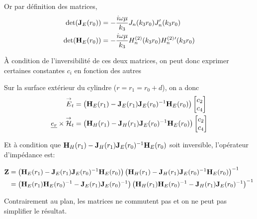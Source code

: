         Or par définition des matrices,
        \begin{align}
            \det(\mathbf{J}_E(r_0)) &= -\dfrac{i\omega\mu}{k_3}J_n(k_3r_0)J_n'(k_3r_0)
            \\
            \det(\mathbf{H}_E(r_0)) &= -\dfrac{i\omega\mu}{k_3}H_n^{(2)}(k_3r_0)H_n^{(2)}{}'(k_3r_0)
        \end{align}

        
        À condition de l'inversibilité de ces deux matrices, on peut donc exprimer certaines constantes $c_i$ en fonction des autres

        Sur la surface extérieur du cylindre ($r=r_1= r_0 + d$), on a donc 
        \begin{align}
            {\overset{\rightarrow}{E}}_t &= 
            \left(\mathbf{H}_{E}(r_1) - \mathbf{J}_{E}(r_1)\mathbf{J}_{E}(r_0)^{-1}\mathbf{H}_{E}(r_0)\right)
            \begin{bmatrix}
                c_2 \\
                c_4
            \end{bmatrix}
            \\
            \underline{e_r}\times{\overset{\rightarrow}{\mathcal{H}}}_t &= 
            \left(\mathbf{H}_{H}(r_1) - \mathbf{J}_{H}(r_1)\mathbf{J}_{E}(r_0)^{-1}\mathbf{H}_{E}(r_0) \right)
            \begin{bmatrix}
                c_2 \\
                c_4
            \end{bmatrix}
        \end{align}

        Et à condition que $\mathbf{H}_{H}(r_1) - \mathbf{J}_{H}(r_1)\mathbf{J}_{E}(r_0)^{-1}\mathbf{H}_{E}(r_0)$ soit inversible, l'opérateur d'impédance est:


        \begin{align}
            \mathbf{Z} &= 
            \left(\mathbf{H}_{E}(r_1) - \mathbf{J}_{E}(r_1)\mathbf{J}_{E}(r_0)^{-1}\mathbf{H}_{E}(r_0)\right)
            \left(\mathbf{H}_{H}(r_1) - \mathbf{J}_{H}(r_1)\mathbf{J}_{E}(r_0)^{-1}\mathbf{H}_{E}(r_0)\right)^{-1}
            \\
            &=
            \left(\mathbf{H}_{E}(r_1)\mathbf{H}_{E}(r_0)^{-1} - \mathbf{J}_{E}(r_1)\mathbf{J}_{E}(r_0)^{-1}\right)
            \left(\mathbf{H}_{H}(r_1)\mathbf{H}_{E}(r_0)^{-1} - \mathbf{J}_{H}(r_1)\mathbf{J}_{E}(r_0)^{-1}\right)^{-1}
        \end{align}

        Contrairement au plan, les matrices ne commutent pas et on ne peut pas simplifier le résultat.


